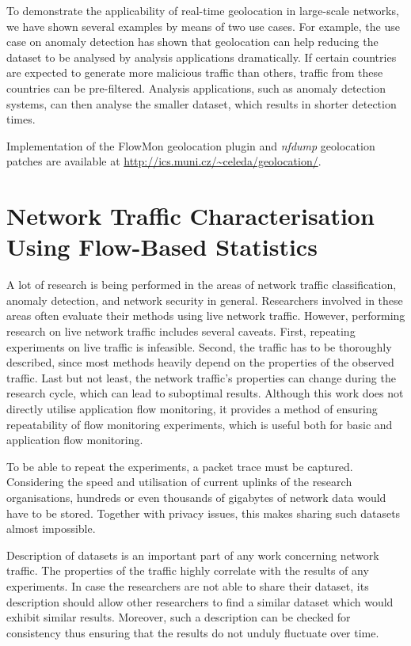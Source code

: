 To demonstrate the applicability of real-time geolocation in large-scale networks, we have shown several examples by means of two use cases. For example, the use case on anomaly detection has shown that geolocation can help reducing the dataset to be analysed by analysis applications dramatically. If certain countries are expected to generate more malicious traffic than others, traffic from these countries can be pre-filtered. Analysis applications, such as anomaly detection systems, can then analyse the smaller dataset, which results in shorter detection times.

Implementation of the FlowMon geolocation plugin and \emph{nfdump} geolocation patches are available at \url{http://ics.muni.cz/~celeda/geolocation/}.




\section{Network Traffic Characterisation Using Flow-Based Statistics}\label{sec:analysis-characterisation}

A lot of research is being performed in the areas of network traffic classification, anomaly detection, and network security in general. Researchers involved in these areas often evaluate their methods using live network traffic. However, performing research on live network traffic includes several caveats. First, repeating experiments on live traffic is infeasible. Second, the traffic has to be thoroughly described, since most methods heavily depend on the properties of the observed traffic. Last but not least, the network traffic's properties can change during the research cycle, which can lead to suboptimal results. Although this work does not directly utilise application flow monitoring, it provides a method of ensuring repeatability of flow monitoring experiments, which is useful both for basic and application flow monitoring.

To be able to repeat the experiments, a packet trace must be captured. Considering the speed and utilisation of current uplinks of the research organisations, hundreds or even thousands of gigabytes of network data would have to be stored. Together with privacy issues, this makes sharing such datasets almost impossible. 

Description of datasets is an important part of any work concerning network traffic. The properties of the traffic highly correlate with the results of any experiments. In case the researchers are not able to share their dataset, its description should allow other researchers to find a similar dataset which would exhibit similar results. Moreover, such a description can be checked for consistency thus ensuring that the results do not unduly fluctuate over time.

